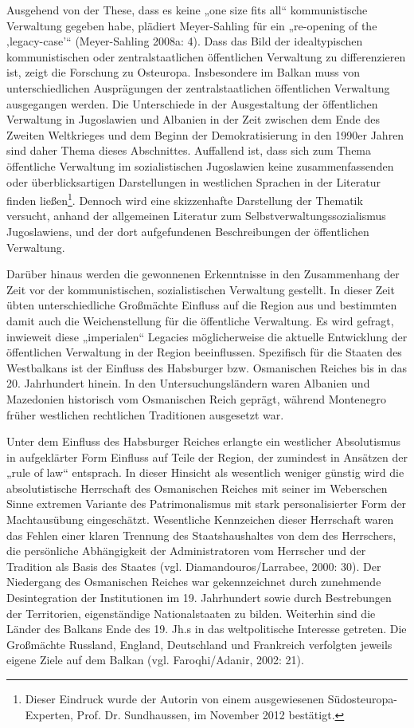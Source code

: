 Ausgehend von der These, dass es keine „one size fits all“ kommunistische Verwaltung gegeben habe, plädiert Meyer-Sahling für ein „re-opening of the ‚legacy-case’“ (Meyer-Sahling 2008a:  4). Dass das Bild der idealtypischen kommunistischen oder zentralstaatlichen öffentlichen Verwaltung zu differenzieren ist, zeigt die Forschung zu Osteuropa. Insbesondere im Balkan muss von unterschiedlichen Ausprägungen der zentralstaatlichen öffentlichen Verwaltung ausgegangen werden. Die Unterschiede in der Ausgestaltung der öffentlichen Verwaltung in Jugoslawien und Albanien in der Zeit zwischen dem Ende des Zweiten Weltkrieges und dem Beginn der Demokratisierung in den 1990er Jahren sind daher Thema dieses Abschnittes. Auffallend ist, dass sich zum Thema öffentliche Verwaltung im sozialistischen Jugoslawien keine zusammenfassenden oder überblicksartigen Darstellungen in westlichen Sprachen in der Literatur finden ließen\footnote{Dieser Eindruck wurde der Autorin von einem ausgewiesenen Südosteuropa-Experten, Prof. Dr. Sundhaussen, im November 2012 bestätigt.}. Dennoch wird eine skizzenhafte Darstellung der Thematik versucht, anhand der allgemeinen Literatur zum Selbstverwaltungssozialismus Jugoslawiens, und der dort aufgefundenen Beschreibungen der öffentlichen Verwaltung.\par
Darüber hinaus werden die gewonnenen Erkenntnisse in den Zusammenhang der Zeit vor der kommunistischen, sozialistischen Verwaltung gestellt. In dieser Zeit übten unterschiedliche Großmächte Einfluss auf die Region aus und bestimmten damit auch die Weichenstellung für die öffentliche Verwaltung. Es wird gefragt, inwieweit diese „imperialen“ Legacies möglicherweise die aktuelle Entwicklung der öffentlichen Verwaltung in der Region beeinflussen. Spezifisch für die Staaten des Westbalkans ist der Einfluss des Habsburger bzw. Osmanischen Reiches bis in das 20. Jahrhundert hinein. In den Untersuchungsländern waren Albanien und Mazedonien historisch vom Osmanischen Reich geprägt, während Montenegro früher westlichen rechtlichen Traditionen ausgesetzt war.\par
Unter dem Einfluss des Habsburger Reiches erlangte ein westlicher Absolutismus in aufgeklärter Form Einfluss auf Teile der Region, der zumindest in Ansätzen der „rule of law“ entsprach. In dieser Hinsicht als wesentlich weniger günstig wird die absolutistische Herrschaft des Osmanischen Reiches mit seiner im Weberschen Sinne extremen Variante des Patrimonalismus mit stark personalisierter Form der Machtausübung eingeschätzt. Wesentliche Kennzeichen dieser Herrschaft waren das Fehlen einer klaren Trennung des Staatshaushaltes von dem des Herrschers, die persönliche Abhängigkeit der Administratoren vom Herrscher und der Tradition als Basis des Staates (vgl. Diamandouros/Larrabee, 2000: 30). Der Niedergang des Osmanischen Reiches war gekennzeichnet durch zunehmende Desintegration der Institutionen im 19. Jahrhundert sowie durch Bestrebungen der Territorien, eigenständige Nationalstaaten zu bilden. Weiterhin sind die Länder des Balkans Ende des 19. Jh.s in das weltpolitische Interesse getreten. Die Großmächte Russland, England, Deutschland und Frankreich verfolgten jeweils eigene Ziele auf dem Balkan (vgl. Faroqhi/Adanir, 2002: 21).\par

